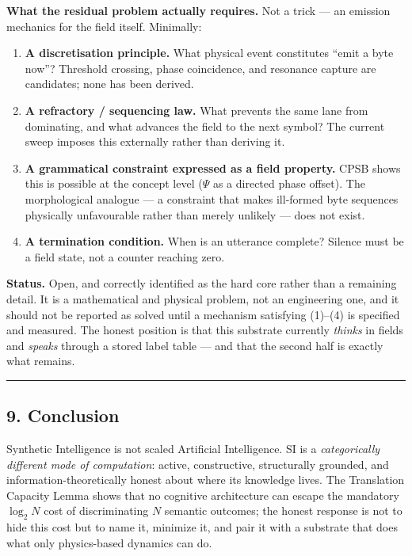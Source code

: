 \documentclass[
  11pt,
  a4paper,
]{article}
\providecommand{\tightlist}{%
  \setlength{\itemsep}{0pt}\setlength{\parskip}{0pt}}
\begin{document}
\textbf{What the residual problem actually requires.} Not a trick --- an
emission mechanics for the field itself. Minimally:

\begin{enumerate}
\def\labelenumi{\arabic{enumi}.}
\tightlist
\item
  \textbf{A discretisation principle.} What physical event constitutes
  ``emit a byte now''? Threshold crossing, phase coincidence, and
  resonance capture are candidates; none has been derived.
\item
  \textbf{A refractory / sequencing law.} What prevents the same lane
  from dominating, and what advances the field to the next symbol? The
  current sweep imposes this externally rather than deriving it.
\item
  \textbf{A grammatical constraint expressed as a field property.} CPSB
  shows this is possible at the concept level (\(\Psi\) as a directed
  phase offset). The morphological analogue --- a constraint that makes
  ill-formed byte sequences physically unfavourable rather than merely
  unlikely --- does not exist.
\item
  \textbf{A termination condition.} When is an utterance complete?
  Silence must be a field state, not a counter reaching zero.
\end{enumerate}

\textbf{Status.} Open, and correctly identified as the hard core rather
than a remaining detail. It is a mathematical and physical problem, not
an engineering one, and it should not be reported as solved until a
mechanism satisfying (1)--(4) is specified and measured. The honest
position is that this substrate currently \emph{thinks} in fields and
\emph{speaks} through a stored label table --- and that the second half
is exactly what remains.

\begin{center}\rule{0.5\linewidth}{0.5pt}\end{center}

\subsection{9. Conclusion}\label{conclusion}

Synthetic Intelligence is not scaled Artificial Intelligence. SI is a
\emph{categorically different mode of computation}: active,
constructive, structurally grounded, and information-theoretically
honest about where its knowledge lives. The Translation Capacity Lemma
shows that no cognitive architecture can escape the mandatory
\(\log_2 N\) cost of discriminating \(N\) semantic outcomes; the honest
response is not to hide this cost but to name it, minimize it, and pair
it with a substrate that does what only physics-based dynamics can do.
\end{document}

